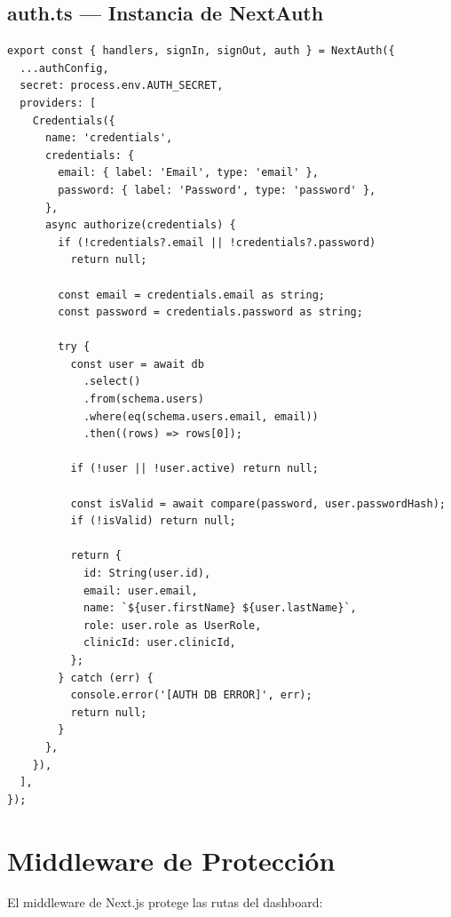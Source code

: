 \subsection{auth.ts --- Instancia de NextAuth}

\begin{lstlisting}[style=typescript, caption=auth.ts - Proveedor de credenciales]
export const { handlers, signIn, signOut, auth } = NextAuth({
  ...authConfig,
  secret: process.env.AUTH_SECRET,
  providers: [
    Credentials({
      name: 'credentials',
      credentials: {
        email: { label: 'Email', type: 'email' },
        password: { label: 'Password', type: 'password' },
      },
      async authorize(credentials) {
        if (!credentials?.email || !credentials?.password)
          return null;

        const email = credentials.email as string;
        const password = credentials.password as string;

        try {
          const user = await db
            .select()
            .from(schema.users)
            .where(eq(schema.users.email, email))
            .then((rows) => rows[0]);

          if (!user || !user.active) return null;

          const isValid = await compare(password, user.passwordHash);
          if (!isValid) return null;

          return {
            id: String(user.id),
            email: user.email,
            name: `${user.firstName} ${user.lastName}`,
            role: user.role as UserRole,
            clinicId: user.clinicId,
          };
        } catch (err) {
          console.error('[AUTH DB ERROR]', err);
          return null;
        }
      },
    }),
  ],
});
\end{lstlisting}

\section{Middleware de Protecci\'on}

El middleware de Next.js protege las rutas del dashboard:

